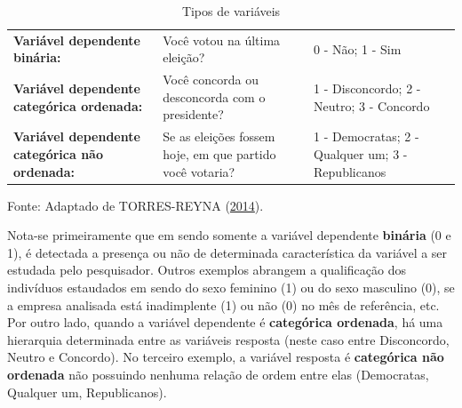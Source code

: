 \documentclass[12pt,brazil,oneside]{book}
\begin{document}
\begin{longtable}[]{@{}lll@{}}
\caption{\label{tab:logtip}Tipos de variáveis}\tabularnewline
\toprule
\endhead
\begin{minipage}[t]{0.30\columnwidth}\raggedright
\textbf{Variável dependente binária:}\strut
\end{minipage} & \begin{minipage}[t]{0.30\columnwidth}\raggedright
Você votou na última eleição?\strut
\end{minipage} & \begin{minipage}[t]{0.30\columnwidth}\raggedright
0 - Não; 1 - Sim\strut
\end{minipage}\tabularnewline
\begin{minipage}[t]{0.30\columnwidth}\raggedright
\textbf{Variável dependente categórica ordenada:}\strut
\end{minipage} & \begin{minipage}[t]{0.30\columnwidth}\raggedright
Você concorda ou desconcorda com o presidente?\strut
\end{minipage} & \begin{minipage}[t]{0.30\columnwidth}\raggedright
1 - Disconcordo; 2 - Neutro; 3 - Concordo\strut
\end{minipage}\tabularnewline
\begin{minipage}[t]{0.30\columnwidth}\raggedright
\textbf{Variável dependente categórica não ordenada:}\strut
\end{minipage} & \begin{minipage}[t]{0.30\columnwidth}\raggedright
Se as eleições fossem hoje, em que partido você votaria?\strut
\end{minipage} & \begin{minipage}[t]{0.30\columnwidth}\raggedright
1 - Democratas; 2 - Qualquer um; 3 - Republicanos\strut
\end{minipage}\tabularnewline
\bottomrule
\end{longtable}

Fonte: Adaptado de TORRES-REYNA
(\protect\hyperlink{ref-Torres-Reyna2014}{2014}).

Nota-se primeiramente que em sendo somente a variável dependente
\textbf{binária} (0 e 1), é detectada a presença ou não de determinada
característica da variável a ser estudada pelo pesquisador. Outros
exemplos abrangem a qualificação dos indivíduos estaudados em sendo do
sexo feminino (1) ou do sexo masculino (0), se a empresa analisada está
inadimplente (1) ou não (0) no mês de referência, etc. Por outro lado,
quando a variável dependente é \textbf{categórica ordenada}, há uma
hierarquia determinada entre as variáveis resposta (neste caso entre
Disconcordo, Neutro e Concordo). No terceiro exemplo, a variável
resposta é \textbf{categórica não ordenada} não possuindo nenhuma
relação de ordem entre elas (Democratas, Qualquer um, Republicanos).
\end{document}
